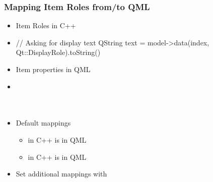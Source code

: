 \begin{slide}[fragile]{}\frametitle{Mapping Item Roles from/to QML}
  \begin{itemize}
      \item Item Roles in C++
      \item[]
      \begin{cpp}
// Asking for display text
QString text = model->data(index, Qt::DisplayRole).toString()
      \end{cpp}
      \vspace*{1.0em}
      \item Item properties in QML
      \item[]
      \begin{qml}
\\
\\
\qtt{\}}\\
      \end{qml}
      \item Default mappings
      \begin{itemize}
          \item {} in C++ is  in QML
          \item {} in C++ is  in QML
      \end{itemize}
      \item Set additional mappings with 
  \end{itemize}
\end{slide}

